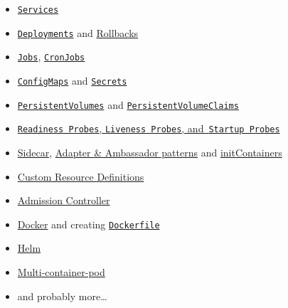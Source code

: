 \begin{multicols}{3}
\begin{itemize}
    \item \href{https://kubernetes.io/docs/concepts/services-networking/service/}{\texttt{Services}}
    \item \href{https://kubernetes.io/docs/concepts/workloads/controllers/deployment/}{\texttt{Deployments}} and \href{https://kubernetes.io/docs/concepts/workloads/controllers/deployment/#rolling-back-a-deployment}{Rollbacks}
    \item \href{https://kubernetes.io/docs/concepts/workloads/controllers/job/}{\texttt{Jobs}}, \href{https://kubernetes.io/docs/concepts/workloads/controllers/cron-jobs/}{\texttt{CronJobs}}
    \item \href{https://kubernetes.io/docs/concepts/configuration/configmap/}{\texttt{ConfigMaps}} and \href{https://kubernetes.io/docs/concepts/configuration/secret/}{\texttt{Secrets}}
    \item \href{https://kubernetes.io/docs/concepts/storage/persistent-volumes/}{\texttt{PersistentVolumes}} and \href{https://kubernetes.io/docs/concepts/storage/persistent-volumes/#reserving-a-persistentvolume}{\texttt{PersistentVolumeClaims}}
    \item \href{https://kubernetes.io/docs/tasks/configure-pod-container/configure-liveness-readiness-startup-probes/}{\texttt{Readiness Probes}, \texttt{Liveness Probes}, and~\texttt{Startup Probes}}
    \item \href{https://kubernetes.io/docs/concepts/workloads/pods/sidecar-containers/}{Sidecar}, \href{https://kubernetes.io/blog/2015/06/the-distributed-system-toolkit-patterns/}{Adapter \& Ambassador patterns} and \href{https://kubernetes.io/docs/concepts/workloads/pods/init-containers/}{initContainers}
    \item \href{https://kubernetes.io/docs/concepts/extend-kubernetes/api-extension/custom-resources/}{Custom Resource Definitions}
    \item \href{https://kubernetes.io/docs/reference/access-authn-authz/admission-controllers/}{Admission Controller}
    \item \href{https://docs.docker.com/}{Docker} and creating \href{https://docs.docker.com/reference/dockerfile/}{\texttt{Dockerfile}}
    \item \href{https://helm.sh/docs/intro/install/}{Helm}
    \item \href{https://kubernetes.io/blog/2025/04/22/multi-container-pods-overview/}{Multi-container-pod}
    \item and probably more\ldots
\end{itemize}
\end{multicols}

